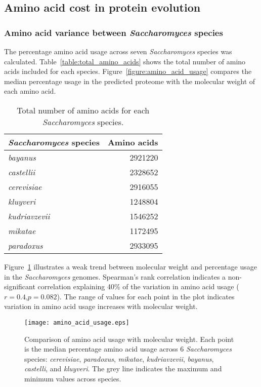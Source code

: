 \subsection{Amino acid cost in protein evolution}

\subsubsection{Amino acid variance between \emph{Saccharomyces} species}

The percentage amino acid usage across seven \emph{Saccharomyces} species was calculated. Table~\vref{table:total_amino_acids} shows the total number of amino acids included for each species. Figure~\vref{figure:amino_acid_usage} compares the median percentage usage in the predicted proteome with the molecular weight of each amino acid.

\begin{table}
  \centering
  \begin{tabular}{ l r }
                                                  \toprule
    \emph{Saccharomyces} species & Amino acids \\ \midrule
    \emph{bayanus}               & 2921220     \\
    \emph{castellii}             & 2328652     \\
    \emph{cerevisiae}            & 2916055     \\
    \emph{kluyveri}              & 1248804     \\
    \emph{kudriavzevii}          & 1546252     \\
    \emph{mikatae}               & 1172495     \\
    \emph{paradoxus}             & 2933095     \\ \bottomrule
  \end{tabular}
  \caption{Total number of amino acids for each \emph{Saccharomyces} species.}
  \label{table:total_amino_acids}
\end{table}

Figure~\ref{figure:amino_acid_usage} illustrates a weak trend between molecular weight and percentage usage in the \emph{Saccharomyces} genomes. Spearman's rank correlation indicates a non-significant correlation explaining 40\% of the variation in amino acid usage ($r = 0.4$,$p = 0.082$). The range of values for each point in the plot indicates variation in amino acid usage increases with molecular weight.

\begin{figure}
  \centering
  \texttt{[image: amino\_acid\_usage.eps]}
  \caption[Comparison of amino acid usage with molecular weight]{Comparison of amino acid usage with molecular weight. Each point is the median percentage amino acid usage across 6 \emph{Saccharomyces} species: \emph{cerevisiae}, \emph{paradoxus}, \emph{mikatae}, \emph{kudriavzevii}, \emph{bayanus}, \emph{castelli}, and \emph{kluyveri}. The grey line indicates the maximum and minimum values across species.}
  \label{figure:amino_acid_usage}
\end{figure}

